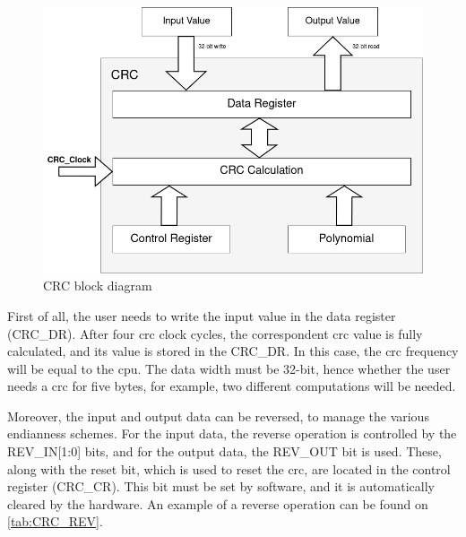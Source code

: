 \begin{figure}[]
	\centering
 	\includegraphics[width=0.65\linewidth]{Images/CrcBlockDiagram.png}
 	\caption{CRC block diagram}
	 \label{fig_CrcBlockDiagram}
\end{figure}

First of all, the user needs to write the input value 
in the data register (CRC\_DR). After four \gls{crc} clock cycles, the correspondent \gls{crc} value is fully calculated, and its
value is stored in the CRC\_DR. In this case, the \gls{crc} frequency will be equal to the \gls{cpu}. The data width must be 32-bit, 
hence whether the user needs a \gls{crc} for five bytes, for example, two different computations will be needed. 

Moreover, the input and output data can be reversed, to manage the various endianness schemes. For the input data, the reverse operation 
is controlled by the REV\_IN[1:0] bits, and for the output data, the REV\_OUT bit is used. These, along with the reset bit, which is used to 
reset the \gls{crc}, are located in the control register (CRC\_CR). This bit must be set by software, and it is automatically cleared by
the hardware. An example of a reverse operation can be found on \autoref{tab:CRC_REV}.

